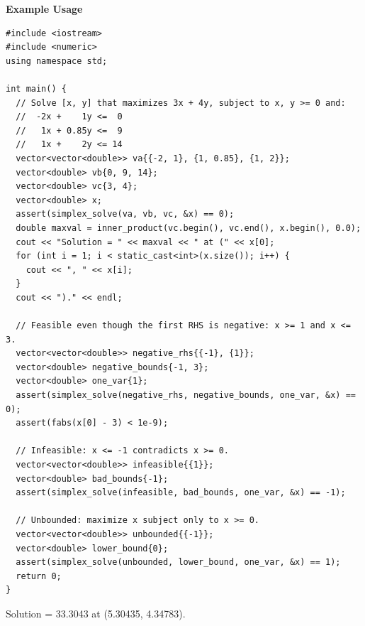 \textbf{Example Usage}\par
\begin{lstlisting}[style=cpp]
#include <iostream>
#include <numeric>
using namespace std;

int main() {
  // Solve [x, y] that maximizes 3x + 4y, subject to x, y >= 0 and:
  //  -2x +    1y <=  0
  //   1x + 0.85y <=  9
  //   1x +    2y <= 14
  vector<vector<double>> va{{-2, 1}, {1, 0.85}, {1, 2}};
  vector<double> vb{0, 9, 14};
  vector<double> vc{3, 4};
  vector<double> x;
  assert(simplex_solve(va, vb, vc, &x) == 0);
  double maxval = inner_product(vc.begin(), vc.end(), x.begin(), 0.0);
  cout << "Solution = " << maxval << " at (" << x[0];
  for (int i = 1; i < static_cast<int>(x.size()); i++) {
    cout << ", " << x[i];
  }
  cout << ")." << endl;

  // Feasible even though the first RHS is negative: x >= 1 and x <= 3.
  vector<vector<double>> negative_rhs{{-1}, {1}};
  vector<double> negative_bounds{-1, 3};
  vector<double> one_var{1};
  assert(simplex_solve(negative_rhs, negative_bounds, one_var, &x) == 0);
  assert(fabs(x[0] - 3) < 1e-9);

  // Infeasible: x <= -1 contradicts x >= 0.
  vector<vector<double>> infeasible{{1}};
  vector<double> bad_bounds{-1};
  assert(simplex_solve(infeasible, bad_bounds, one_var, &x) == -1);

  // Unbounded: maximize x subject only to x >= 0.
  vector<vector<double>> unbounded{{-1}};
  vector<double> lower_bound{0};
  assert(simplex_solve(unbounded, lower_bound, one_var, &x) == 1);
  return 0;
}
\end{lstlisting}
\begin{exampleoutput}
Solution = 33.3043 at (5.30435, 4.34783).
\end{exampleoutput}
